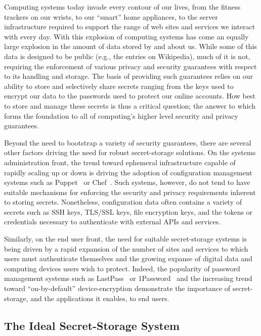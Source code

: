 Computing systems today invade every contour of our lives, from the
fitness trackers on our wrists, to our ``smart'' home appliances, to
the server infrastructure required to support the range of web sites
and services we interact with every day. With this explosion of
computing systems has come an equally large explosion in the amount of
data stored by and about us. While some of this data is designed to be
public (e.g., the entries on Wikipedia), much of it is not, requiring
the enforcement of various privacy and security guarantees with
respect to its handling and storage. The basis of providing such
guarantees relies on our ability to store and selectively share
secrets ranging from the keys used to encrypt our data to the
passwords used to protect our online accounts. How best to store and
manage these secrets is thus a critical question; the answer to which
forms the foundation to all of computing's higher level security and
privacy guarantees.

Beyond the need to bootstrap a variety of security guarantees, there
are several other factors driving the need for robust secret-storage
solutions. On the systems administration front, the trend toward
ephemeral infrastructure capable of rapidly scaling up or down is
driving the adoption of configuration management systems such as
Puppet~\cite{puppet} or Chef~\cite{chef}. Such systems, however, do
not tend to have suitable mechanisms for enforcing the security and
privacy requirements inherent to storing secrets. Nonetheless,
configuration data often contains a variety of secrets such as SSH
keys, TLS/SSL keys, file encryption keys, and the tokens or
credentials necessary to authenticate with external APIs and services.

Similarly, on the end user front, the need for suitable secret-storage
systems is being driven by a rapid expansion of the number of sites
and services to which users must authenticate themselves and the
growing expanse of digital data and computing devices users wish to
protect. Indeed, the popularity of password management systems such as
LastPass~\cite{lastpass} or 1Password~\cite{onepassword} and the
increasing trend toward ``on-by-default'' device-encryption
demonstrate the importance of secret-storage, and the applications it
enables, to end users.

\subsection{The Ideal Secret-Storage System}

